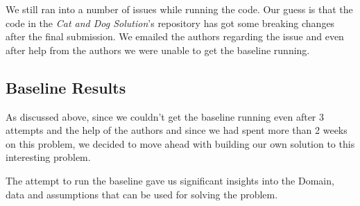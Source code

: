 \documentclass[final,leqno,onefignum,onetabnum]{siamltexmm}
\begin{document}
We still ran into a number of issues while running the code.  Our guess is that the code in the \textit{Cat and Dog Solution}'s repository has got some breaking changes after the final submission.  We emailed the authors regarding the issue and even after help from the authors we were unable to get the baseline running.

\subsection{Baseline Results}
As discussed above, since we couldn't get the baseline running even after 3 attempts and the help of the authors and since we had spent more than 2 weeks on this problem, we decided to move ahead with building our own solution to this interesting problem.


The attempt to run the baseline gave us significant insights into the Domain, data and assumptions that can be used for solving the problem.


\newpage



\end{document}
